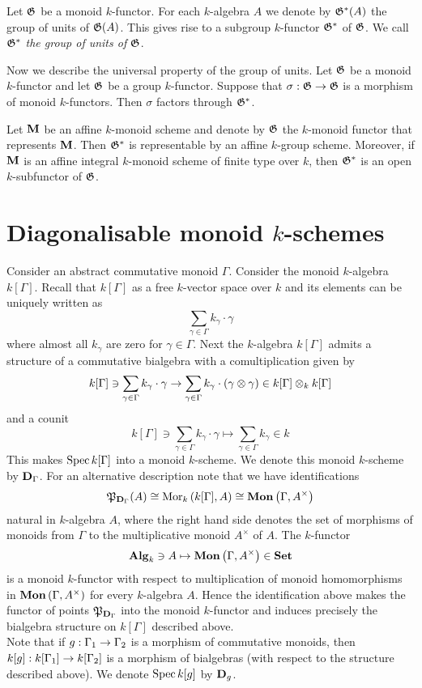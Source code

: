 \begin{definition}
Let ${\mathfrak G}$ be a monoid $k$-functor. For each $k$-algebra $A$ we denote by ${\mathfrak G}^*(A)$ the group of units of ${\mathfrak G}(A)$. This gives rise to a subgroup $k$-functor ${\mathfrak G}^*$ of ${\mathfrak G}$. We call ${\mathfrak G}^*$ \textit{the group of units of ${\mathfrak G}$}.
\end{definition}
\noindent
Now we describe the universal property of the group of units. Let ${\mathfrak G}$ be a monoid $k$-functor and let ${\mathfrak G}$ be a group $k$-functor. Suppose that $\sigma:{\mathfrak G}\rightarrow {\mathfrak G}$ is a morphism of monoid $k$-functors. Then $\sigma$ factors through ${\mathfrak G}^*$.

\begin{proposition}\label{proposition:integral_monoids_groups_of_units_are_schematically_dense}
Let $\mathbf{M}$ be an affine $k$-monoid scheme and denote by ${\mathfrak G}$ the $k$-monoid functor that represents $\mathbf{M}$. Then ${\mathfrak G}^*$ is representable by an affine $k$-group scheme. Moreover, if $\mathbf{M}$ is an affine integral $k$-monoid scheme of finite type over $k$, then ${\mathfrak G}^*$ is an open $k$-subfunctor of ${\mathfrak G}$.
\end{proposition}



\section{Diagonalisable monoid $k$-schemes}
\noindent
Consider an abstract commutative monoid $\Gamma$. Consider the monoid $k$-algebra $k[\Gamma]$. Recall that $k[\Gamma]$ as a free $k$-vector space over $k$ and its elements can be uniquely written as
$$\sum_{\gamma\in \Gamma}k_{\gamma}\cdot \gamma$$
where almost all $k_{\gamma}$ are zero for $\gamma \in \Gamma$. Next the $k$-algebra $k[\Gamma]$ admits a structure of a commutative bialgebra with a comultiplication given by
$$k[\Gamma] \ni \sum_{\gamma\in \Gamma} k_{\gamma}\cdot \gamma \rightarrow \sum_{\gamma\in \Gamma}k_{\gamma}\cdot \left(\gamma\otimes \gamma\right)\in  k[\Gamma]\otimes_kk[\Gamma]$$
and a counit
$$k[\Gamma]\ni \sum_{\gamma \in \Gamma}k_{\gamma}\cdot \gamma \mapsto \sum_{\gamma\in \Gamma}k_{\gamma}\in k$$
This makes $\mathrm{Spec}\, k[\Gamma]$ into a monoid $k$-scheme. We denote this monoid $k$-scheme by $\mathbf{D}_{\Gamma}$. For an alternative description note that we have identifications
$${\mathfrak P}_{\mathbf{D}_{\Gamma}}(A) \cong \mathrm{Mor}_k\left(k[\Gamma],A\right) \cong \mathbf{Mon}\left(\Gamma,A^{\times}\right)$$
natural in $k$-algebra $A$, where the right hand side denotes the set of morphisms of monoids from $\Gamma$ to the multiplicative monoid $A^{\times}$ of $A$. The $k$-functor
$$\mathbf{Alg}_k\ni A\mapsto \mathbf{Mon}\left(\Gamma,A^{\times}\right)\in \mathbf{Set}$$
is a monoid $k$-functor with respect to multiplication of monoid homomorphisms in $\mathbf{Mon}\left(\Gamma,A^{\times}\right)$ for every $k$-algebra $A$. Hence the identification above makes the functor of points ${\mathfrak P}_{\mathbf{D}_{\Gamma}}$ into the monoid $k$-functor and induces precisely the bialgebra structure on $k[\Gamma]$ described above.\\
Note that if $g:\Gamma_1\rightarrow \Gamma_2$ is a morphism of commutative monoids, then $k[g]:k[\Gamma_1]\rightarrow k[\Gamma_2]$ is a morphism of bialgebras (with respect to the structure described above). We denote $\mathrm{Spec}\, k[g]$ by $\mathbf{D}_{g}$.

